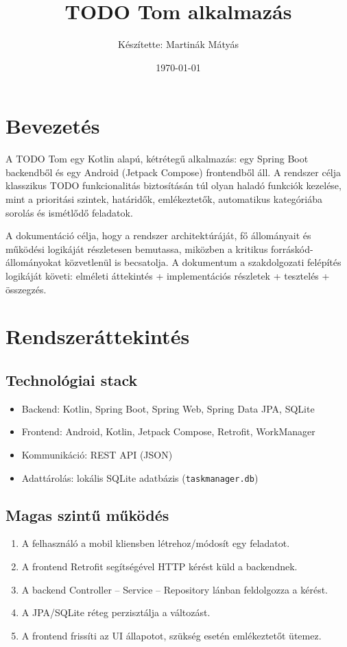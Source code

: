 \documentclass[12pt,a4paper]{article}
\title{TODO Tom alkalmazás}
\author{Készítette: Martinák Mátyás}
\date{\today}
\begin{document}
\maketitle
\tableofcontents
\newpage

\section{Bevezetés}
A TODO Tom egy Kotlin alapú, kétrétegű alkalmazás: egy Spring Boot backendből és egy Android (Jetpack Compose) frontendből áll. A rendszer célja klasszikus TODO funkcionalitás biztosításán túl olyan haladó funkciók kezelése, mint a prioritási szintek, határidők, emlékeztetők, automatikus kategóriába sorolás és ismétlődő feladatok.

A dokumentáció célja, hogy a rendszer architektúráját, fő állományait és működési logikáját részletesen bemutassa, miközben a kritikus forráskód-állományokat közvetlenül is becsatolja. A dokumentum a szakdolgozati felépítés logikáját követi: elméleti áttekintés + implementációs részletek + tesztelés + összegzés.

\section{Rendszeráttekintés}
\subsection{Technológiai stack}
\begin{itemize}
  \item Backend: Kotlin, Spring Boot, Spring Web, Spring Data JPA, SQLite
  \item Frontend: Android, Kotlin, Jetpack Compose, Retrofit, WorkManager
  \item Kommunikáció: REST API (JSON)
  \item Adattárolás: lokális SQLite adatbázis (\texttt{taskmanager.db})
\end{itemize}

\subsection{Magas szintű működés}
\begin{enumerate}
  \item A felhasználó a mobil kliensben létrehoz/módosít egy feladatot.
  \item A frontend Retrofit segítségével HTTP kérést küld a backendnek.
  \item A backend Controller -- Service -- Repository lánban feldolgozza a kérést.
  \item A JPA/SQLite réteg perzisztálja a változást.
  \item A frontend frissíti az UI állapotot, szükség esetén emlékeztetőt ütemez.
\end{enumerate}
\end{document}
